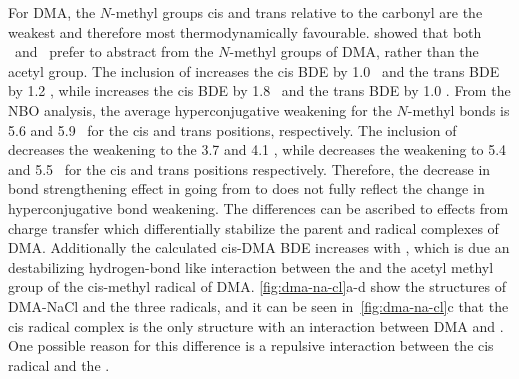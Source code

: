 For DMA, the $N$-methyl groups cis and trans relative to the carbonyl are the weakest and therefore most thermodynamically favourable. \citet{Salamone2013} showed that both \bno\ and \cumo\ prefer to abstract from the $N$-methyl groups of DMA, rather than the acetyl group. The inclusion of  increases the cis BDE by 1.0 \kcalmol\ and the trans BDE by 1.2 \kcalmol, while  increases the cis BDE by 1.8 \kcalmol\ and the trans BDE by 1.0 \kcalmol. From the NBO analysis, the average hyperconjugative weakening for the $N$-methyl  bonds is 5.6 and 5.9 \kcalmol\ for the cis and trans positions, respectively. The inclusion of  decreases the weakening to the 3.7 and 4.1 \kcalmol, while  decreases the weakening to 5.4 and 5.5 \kcalmol\ for the cis and trans positions respectively. Therefore, the decrease in bond strengthening effect in going from  to  does not fully reflect the change in hyperconjugative bond weakening. The differences can be ascribed to effects from charge transfer which differentially stabilize the parent and radical complexes of DMA. Additionally the calculated cis-DMA BDE increases with , which is due an destabilizing hydrogen-bond like interaction between the  and the acetyl methyl group of the cis-methyl radical of DMA. \ref{fig:dma-na-cl}a-d show the structures of DMA-NaCl and the three radicals, and it can be seen in~\ref{fig:dma-na-cl}c that the cis radical complex is the only structure with an interaction between DMA and . One possible reason for this difference is a repulsive interaction between the cis radical and the .

